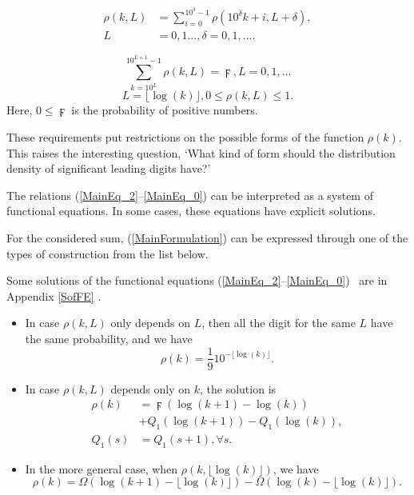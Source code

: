\documentclass[titlepage,fleqn]{article}%
\begin{document}
\begin{align}
\rho(k,L)  &  =%
{\displaystyle\sum\limits_{i=0}^{10^{\delta}-1}}
\rho(10^{\delta}k+i,L+\delta),\label{MainEq_2}\\
L  &  =0,1\ldots,\delta=0,1,\ldots.\nonumber
\end{align}
%

\begin{equation}%
{\displaystyle\sum\limits_{k=10^{L}}^{10^{L+1}-1}}
\rho(k,L)=\digamma,L=0,1,\ldots\label{MainEq_0}%
\end{equation}%
\[
L=\lfloor\log(k)\rfloor,0\leq\rho(k,L)\leq1.
\]
\noindent Here, $0\leq\digamma$ is the probability of positive numbers.

These requirements put restrictions on the possible forms of the function
$\rho(k)$. This raises the interesting question, `What kind of form should the
distribution density of significant leading digits have?'

The relations (\ref{MainEq_2}--\ref{MainEq_0}) can be interpreted as a system
of functional equations. In some cases, these equations have explicit solutions.

For the considered sum, (\ref{MainFormulation}) can be expressed through one
of the types of construction from the list below.

Some solutions of the functional equations (\ref{MainEq_2}--\ref{MainEq_0})
\ are in Appendix
\ref{SofFE}%
.

\begin{itemize}
\item In case $\rho(k,L)$ only depends on $L$, then all the digit for the same
$L$ have the same probability, and we have%
\begin{equation}
\rho(k)=\frac{1}{9}10^{-\lfloor\log(k)\rfloor}. \label{S1}%
\end{equation}


\item In case $\rho(k,L)$ depends only on $k$, the solution is%
\begin{align}
\rho(k)  &  =\digamma\left(  \log(k+1)-\log(k)\right) \label{S2}\\
&  +Q_{1}(\log(k+1))-Q_{1}(\log(k)),\nonumber\\
Q_{1}(s)  &  =Q_{1}(s+1),\forall s.\nonumber
\end{align}


\item In the more general case, when $\rho(k,\lfloor\log(k)\rfloor)$, we have%
\begin{equation}
\rho(k)=\Omega(\log(k+1)-\lfloor\log(k)\rfloor)-\Omega(\log(k)-\lfloor
\log(k)\rfloor). \label{S3}%
\end{equation}

\end{itemize}
\end{document}
